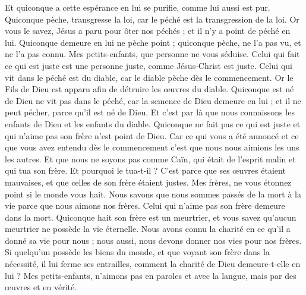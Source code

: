 \begin{multicols}{2}
Et quiconque a cette espérance en lui se purifie, comme lui aussi est pur.
Quiconque pèche, transgresse la loi, car le péché est la transgression de la loi.
Or vous le savez, Jésus a paru pour ôter nos péchés ; et il n'y a point de péché en lui.
Quiconque demeure en lui ne pèche point ; quiconque pèche, ne l'a pas vu, et ne l'a pas connu.
Mes petits-enfants, que personne ne vous séduise. Celui qui fait ce qui est juste est une personne juste, comme Jésus-Christ est juste.
Celui qui vit dans le péché est du diable, car le diable pèche dès le commencement. Or le Fils de Dieu est apparu afin de détruire les œuvres du diable.
Quiconque est né de Dieu ne vit pas dans le péché, car la semence de Dieu demeure en lui ; et il ne peut pécher, parce qu'il est né de Dieu.
Et c'est par là que nous connaissons les enfants de Dieu et les enfants du diable. Quiconque ne fait pas ce qui est juste et qui n'aime pas son frère n'est point de Dieu.
Car ce qui vous a été annoncé et ce que vous avez entendu dès le commencement c’est que nous nous aimions les uns les autres.
Et que nous ne soyons pas comme Caïn, qui était de l'esprit malin et qui tua son frère. Et pourquoi le tua-t-il ? C’est parce que ses œuvres étaient mauvaises, et que celles de son frère étaient justes.
Mes frères, ne vous étonnez point si le monde vous hait.
Nous savons que nous sommes passés de la mort à la vie parce que nous aimons nos frères. Celui qui n'aime pas son frère demeure dans la mort.
Quiconque hait son frère est un meurtrier, et vous savez qu'aucun meurtrier ne possède la vie éternelle.
Nous avons connu la charité en ce qu'il a donné sa vie pour nous ; nous aussi, nous devons donner nos vies pour nos frères.
Si quelqu’un possède les biens du monde, et que voyant son frère dans la nécessité, il lui ferme ses entrailles, comment la charité de Dieu demeure-t-elle en lui ?
Mes petits-enfants, n'aimons pas en paroles et avec la langue, mais par des œuvres et en vérité.

\end{multicols}

